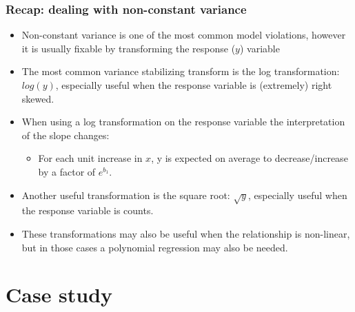 \documentclass[11pt,containsverbatim,handout,xcolor=xelatex,dvipsnames,table]{beamer}
\begin{document}
\begin{frame}
\frametitle{Recap: dealing with non-constant variance}

\begin{itemize}

\item Non-constant variance is one of the most common model violations, however it is usually fixable by transforming the response ($y$) variable

\pause

\item The most common variance stabilizing transform is the log transformation: $log(y)$, especially useful when the response variable is (extremely) right skewed.

\pause

\item When using a log transformation on the response variable the interpretation of the slope changes: \pause
\begin{itemize}
\item For each unit increase in $x$, y is expected on average to decrease/increase by a factor of $e^{b_1}$.
\end{itemize}

\pause

\item Another useful transformation is the square root: $\sqrt{y}$, especially useful when the response variable is counts.

\pause

\item These transformations may also be useful when the relationship is non-linear, but in those cases a polynomial regression may also be needed.

\end{itemize}

\end{frame}


\section{Case study}

\end{document}
